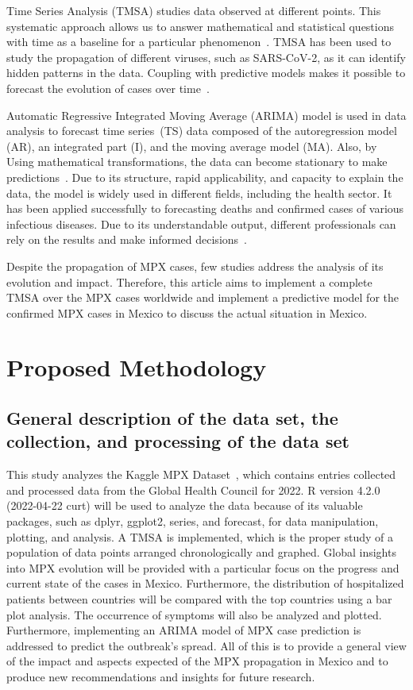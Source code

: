 \documentclass[conference]{IEEEtran}
\begin{document}
Time Series Analysis (TMSA) studies data observed at different points. This systematic approach allows us to answer mathematical and statistical questions with time as a baseline for a particular phenomenon~\cite{Shumway2011}. TMSA has been used to study the propagation of different viruses, such as SARS-CoV-2, as it can identify hidden patterns in the data. Coupling with predictive models makes it possible to forecast the evolution of cases over time~\cite{Khan2020}.

Automatic Regressive Integrated Moving Average (ARIMA) model is used in data analysis to forecast time series~(TS) data composed of the autoregression model (AR), an integrated part (I), and the moving average model (MA). 
Also, by Using mathematical transformations, the data can become stationary to make predictions~\cite{James2021}.
Due to its structure, rapid applicability, and capacity to explain the data, the model is widely used in different fields, including the health sector. It has been applied successfully to forecasting deaths and confirmed cases of various infectious diseases. Due to its understandable output, different professionals can rely on the results and make informed decisions~\cite{Ceylan2020}.

Despite the propagation of MPX cases, few studies address the analysis of its evolution and impact. Therefore, this article aims to implement a complete TMSA over the MPX cases worldwide and implement a predictive model for the confirmed MPX cases in Mexico to discuss the actual situation in Mexico.


\section{Proposed Methodology}

\subsection{General description of the data set, the collection, and processing of the data set}
This study analyzes the Kaggle MPX Dataset~\cite{Contractor2022}, which contains entries collected and processed data from the Global Health Council for 2022. R version 4.2.0 (2022-04-22 curt) will be used to analyze the data because of its valuable packages, such as dplyr, ggplot2, series, and forecast, for data manipulation, plotting, and analysis. A TMSA is implemented, which is the proper study of a population of data points arranged chronologically and graphed. Global insights into MPX evolution will be provided with a particular focus on the progress and current state of the cases in Mexico. Furthermore, the distribution of hospitalized patients between countries will be compared with the top countries using a bar plot analysis. The occurrence of symptoms will also be analyzed and plotted. Furthermore, implementing an ARIMA model of MPX case prediction is addressed to predict the outbreak's spread. All of this is to provide a general view of the impact and aspects expected of the MPX propagation in Mexico and to produce new recommendations and insights for future research.
\end{document}
